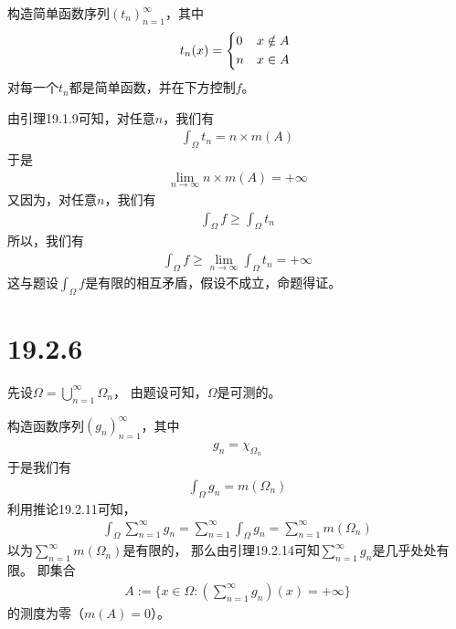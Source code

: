\documentclass{article}
\begin{document}
构造简单函数序列$(t_n)_{n = 1}^\infty$，其中
\begin{equation*}
  t_n(x) =
  \begin{cases*}
    0 & $x \notin A$ \\
    n & $x \in A$
  \end{cases*}
\end{equation*}
对每一个$t_n$都是简单函数，并在下方控制$f$。

由引理19.1.9可知，对任意$n$，我们有
\begin{align*}
  \int_{\Omega} t_n = n \times m(A)
\end{align*}
于是
\begin{align*}
  \lim\limits_{n \to \infty} n \times m(A) = +\infty
\end{align*}
又因为，对任意$n$，我们有
\begin{align*}
  \int_{\Omega} f \geq \int_{\Omega} t_n
\end{align*}
所以，我们有
\begin{align*}
  \int_{\Omega} f \geq \lim\limits_{n \to \infty} \int_{\Omega} t_n = +\infty
\end{align*}
这与题设$\int_{\Omega} f$是有限的相互矛盾，假设不成立，命题得证。

\section*{19.2.6}
先设$\Omega = \bigcup \limits_{n = 1}^\infty \Omega_n$，
由题设可知，$\Omega$是可测的。

构造函数序列$(g_n)_{n = 1}^\infty$，其中
\begin{align*}
  g_n = \chi_{\Omega_n}
\end{align*}
于是我们有
\begin{align*}
  \int_{\Omega} g_n = m(\Omega_n)
\end{align*}
利用推论19.2.11可知，
\begin{align*}
  \int_{\Omega} \sum \limits_{n = 1}^\infty g_n
  = \sum \limits_{n = 1}^\infty \int_{\Omega} g_n
  = \sum \limits_{n = 1}^\infty m(\Omega_n)
\end{align*}
以为$\sum \limits_{n = 1}^\infty m(\Omega_n)$是有限的，
那么由引理19.2.14可知$\sum \limits_{n = 1}^\infty g_n$是几乎处处有限。
即集合
\begin{align*}
  A := \{x \in \Omega: \left(\sum \limits_{n = 1}^\infty g_n\right)(x) = +\infty\}
\end{align*}
的测度为零（$m(A) = 0$）。
\end{document}
